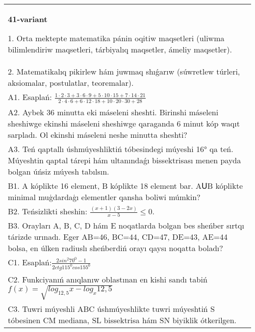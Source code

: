 \documentclass{article}
\begin{document}
\begin{tabular}{m{17cm}}
\textbf{41-variant}

1. Orta mektepte matematika pánin oqitiw maqsetleri (uliwma bilimlendiriw maqsetleri, tárbiyalıq maqsetler, ámeliy maqsetler). \\
2. Matematikalıq pikirlew hám juwmaq shıǵarıw (súwretlew túrleri, aksiomalar, postulatlar, teoremalar). \\
A1. Esaplań: \(\frac{1 \cdot 2 \cdot 3 + 3 \cdot 6 \cdot 9 + 5 \cdot 10 \cdot 15 + 7 \cdot 14 \cdot 21}{2 \cdot 4 \cdot 6 + 6 \cdot 12 \cdot 18 + 10 \cdot 20 \cdot 30 + 28}\) \\
A2. Aybek 36 minutta eki máseleni sheshti. Birinshi máseleni sheshiwge ekinshi máseleni sheshiwge qaraganda 6 minut kóp waqıt sarpladı. Ol ekinshi máseleni neshe minutta sheshti? \\
A3. Teń qaptallı úshmúyeshliktiń tóbesindegi múyeshi 16° qa teń. Múyeshtin qaptal tárepi hám ultanındaǵı bissektrisası menen payda bolgan úńsiz múyesh tabılsın. \\
B1. A kóplikte 16 element, B kóplikte 18 element bar. AՍB kóplikte minimal muģdardaģı elementler qansha boliwi múmkin? \\
B2. Teńsizlikti sheshin: \(\frac{ (x + 1) (3 - 2x) }{x - 5} \leq 0\). \\
B3. Orayları A, B, C, D hám E noqatlarda bolgan bes sheńber sırtqı tárizde urınadı. Eger AB=46, BC=44, CD=47, DE=43, AE=44 bolsa, en úlken radiuslı sheńberdiń orayı qaysı noqatta boladı? \\
C1. Esaplań:\(\frac{2sin^{2}70^{0} - 1}{2ctg115^{0}cos155^{0}}\) \\
C2. Funkciyanıń anıqlanıw oblastınan en kishi sandı tabiń \(f (x) = \sqrt{log_{12,5}x - log_{x}12,5}\) \\
C3. Tuwri múyeshli ABC úshmúyeshlikte tuwri múyeshtiń S tóbesinen CM mediana, SL bissektrisa hám SN biyiklik ótkerilgen. \\

\end{tabular}
\vspace{1cm}
\end{document}

